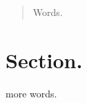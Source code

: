 \documentclass[12pt]{article}
\begin{document}
\maketitle 

\begin{abstract}
    Words.
\end{abstract}

\tableofcontents

\pagebreak

\section{Section.}

more words.
\end{document}

